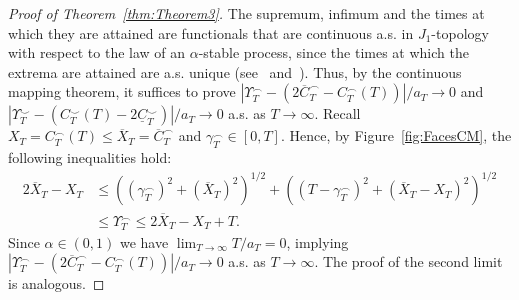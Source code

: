\documentclass[10pt]{amsart}
\theoremstyle{definition}\newtheorem{defi}[theo]{Definition}\newtheorem{rema}[theo]{Remark}\newtheorem{exam}[theo]{Example}\newtheorem{exem}[theo]{Example}\newtheorem{nota}[theo]{Notation}
\newcommand\1{\mathds{1}}
\newcommand\ov[1]{\overline{#1}}
\newcommand\un[1]{\underline{#1}}
\begin{document}
\begin{proof}[Proof of Theorem~\ref{thm:Theorem3}]
The supremum, infimum and the times at which they are attained are functionals that are continuous a.s. in $J_1$-topology with respect to the law of an $\alpha$-stable process, since the times at which the extrema are attained are a.s. unique (see~\cite[Lemma~14.12]{MR1876169} and~\cite[Theorem~2]{MR2978134}). Thus, by the continuous mapping theorem, it suffices to prove $|\Upsilon_T^\frown-(2\ov{C}_T^\frown-C_T^\frown(T))|/a_T\to 0$ and $|\Upsilon_T^\smile-(C_T^\smile(T)-2\un{C}_T^\smile)|/a_T\to 0$ a.s. as $T\to\infty$. Recall $X_T=C_T^\frown(T)\le \ov X_T = \ov{C}_T^\frown$ and $\gamma^\frown_T\in[0,T]$. Hence, by Figure~\ref{fig:FacesCM}, the following inequalities hold:
\begin{align*}
2\ov X_T - X_T &\le \left(\left(\gamma^\frown_T\right)^2 + \left(\ov{X}_T\right)^2\right)^{1/2}+ \left(\left(T-\gamma^\frown_T\right)^2 + \left(\ov{X}_T-X_T\right)^2\right)^{1/2}\\
&\leq \Upsilon^\frown_T
\leq 2\ov X_T - X_T +T.
\end{align*}
Since $\alpha\in(0,1)$ we have $\lim_{T\to\infty} T/a_T= 0$, implying $|\Upsilon_T^\frown-(2\ov{C}_T^\frown-C_T^\frown(T))|/a_T\to 0$ a.s. as $T\to\infty$. The proof of the second limit is analogous.
\end{proof}
\end{document}
